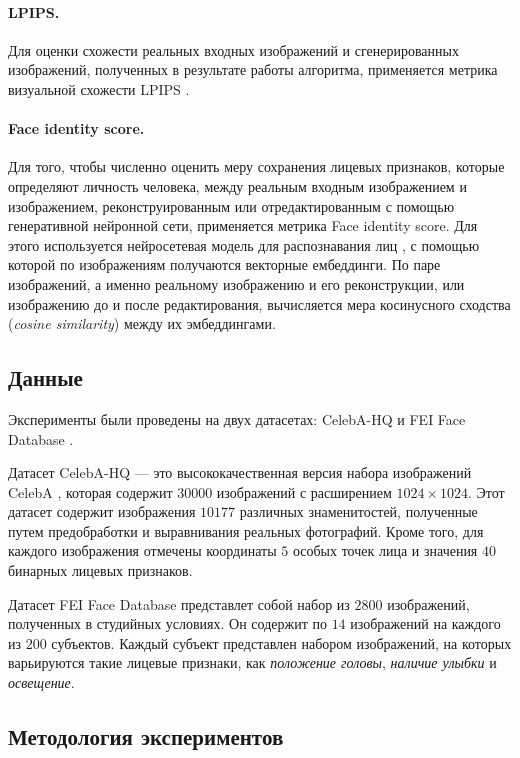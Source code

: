 \paragraph{LPIPS.}
Для оценки схожести реальных входных изображений и сгенерированных изображений, полученных в результате работы алгоритма, применяется метрика визуальной схожести LPIPS \cite{zhang2018lpips}.

\paragraph{Face identity score.}
Для того, чтобы численно оценить меру сохранения лицевых признаков, которые определяют личность человека, между реальным входным изображением и изображением, реконструированным или отредактированным с помощью генеративной нейронной сети, применяется метрика Face identity score.
Для этого используется нейросетевая модель для распознавания лиц \cite{deng2018arcface}, с помощью которой по изображениям получаются векторные ембеддинги.
По паре изображений, а именно реальному изображению и его реконструкции, или изображению до и после редактирования, вычисляется мера косинусного сходства (\emph{cosine similarity}) между их эмбеддингами.


\subsection{Данные}
Эксперименты были проведены на двух датасетах: CelebA-HQ \cite{progressive-growing-gan} и FEI Face Database \cite{fei-database}.

Датасет CelebA-HQ --- это высококачественная версия набора изображений CelebA \cite{liu2015celeba}, которая содержит $30000$ изображений с расширением $1024\times1024$.
Этот датасет содержит изображения $10177$ различных знаменитостей, полученные путем предобработки и выравнивания реальных фотографий.
Кроме того, для каждого изображения отмечены координаты $5$ особых точек лица и значения $40$ бинарных лицевых признаков.

Датасет FEI Face Database представлет собой набор из $2800$ изображений, полученных в студийных условиях.
Он содержит по $14$ изображений на каждого из $200$ субъектов.
Каждый субъект представлен набором изображений, на которых варьируются такие лицевые признаки, как \emph{положение головы}, \emph{наличие улыбки} и \emph{освещение}.


\subsection{Методология экспериментов}
